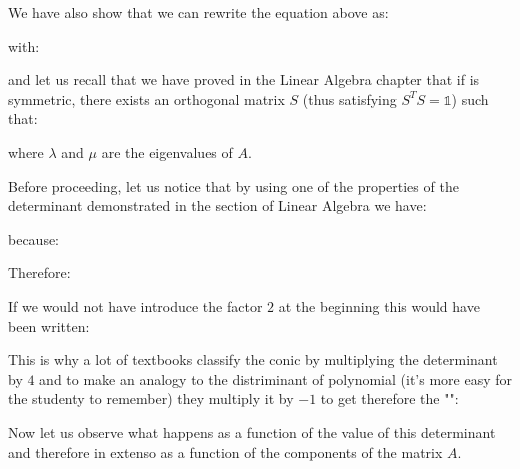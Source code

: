 	We have also show that we can rewrite the equation above as:
	
	with:
	
	and let us recall that we have proved in the Linear Algebra chapter that if is symmetric, there exists an orthogonal matrix $S$ (thus satisfying $S^TS=\mathds{1}$) such that:
	
 	where $\lambda$ and $\mu$ are the eigenvalues of $A$.

	Before proceeding, let us notice that by using one of the properties of the determinant demonstrated in the section of Linear Algebra we have:
	
	because:
	
	Therefore:
	
	\begin{tcolorbox}[title=Remark,colframe=black,arc=10pt]
	If we would not have introduce the factor $2$ at the beginning this would have been written:
	
	This is why a lot of textbooks classify the conic by multiplying the determinant by $4$ and to make an analogy to the distriminant of polynomial (it's more easy for the studenty to remember) they multiply it by $-1$ to get therefore the "":
	
	\end{tcolorbox}
 	Now let us observe what happens as a function of the value of this determinant and therefore in extenso as a function of the components of the matrix $A$.

